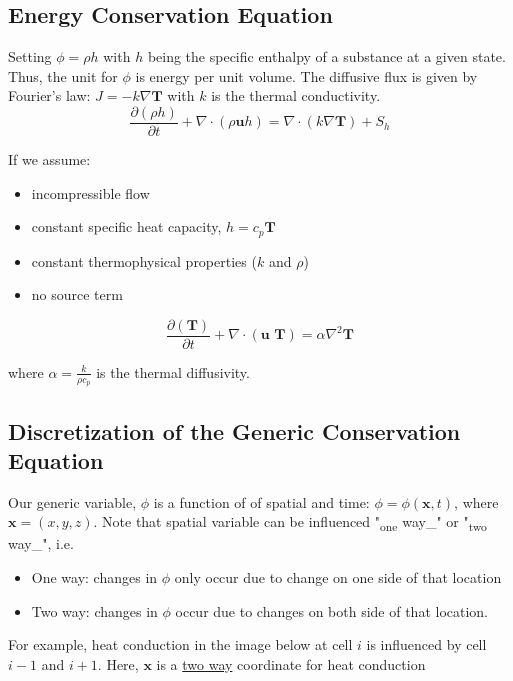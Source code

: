 \documentclass[11pt]{article}
\begin{document}
\subsection{Energy Conservation Equation}
\label{sec:org5ab9c7c}
Setting \(\phi = \rho h\) with \(h\) being the specific enthalpy of a substance at a given state. Thus, the unit for \(\phi\) is
energy per unit volume. The diffusive flux is given by Fourier's law: \(J = -k \nabla \textbf{T}\) with \(k\) is the thermal conductivity.
\begin{equation}
\frac{\partial (\rho h)}{\partial t} + \nabla \cdot (\rho \textbf{u} h)  = \nabla \cdot (k \nabla \textbf{T}) +
S_h
\end{equation}

If we assume:
\begin{itemize}
\item incompressible flow
\item constant specific heat capacity, \(h = c_p \textbf{T}\)
\item constant thermophysical properties (\(k\) and \(\rho\))
\item no source term
\end{itemize}

\begin{equation}
\frac{\partial (\textbf{T})}{\partial t} + \nabla \cdot (\textbf{u T})  = \alpha \nabla ^2 \textbf{T}
\end{equation}

where \(\alpha = \frac{k}{\rho c_p}\) is the thermal diffusivity. 

\subsection{Discretization of the Generic Conservation Equation}
\label{sec:org5a56db8}
Our generic variable, \(\phi\) is a function of of spatial and time: \(\phi = \phi (\textbf{x},t)\), where
\(\textbf{x} = (x,y,z)\). Note that spatial variable can be influenced "\textsubscript{one} way\_" or "\textsubscript{two} way\_", i.e.
\begin{itemize}
\item One way: changes in \(\phi\) only occur due to change on one side of that location
\item Two way: changes in \(\phi\) occur due to changes on both side of that location.
\end{itemize}
For example, heat conduction in the image below at cell \(i\) is influenced by cell \(i-1\) and
\(i+1\). Here, \(\textbf{x}\) is a \uline{two way} coordinate for heat conduction
\end{document}
